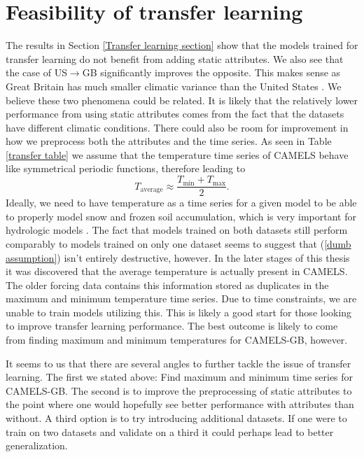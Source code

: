 \section{Feasibility of transfer learning}
The results in Section \ref{Transfer learning section} show that the models trained 
for transfer learning do not benefit from adding static attributes. We also see 
that the case of US$\rightarrow$GB significantly improves the opposite. This makes 
sense as Great Britain has much smaller climatic variance than the United States 
\citationneeded. We believe these two phenomena could be related. It is likely 
that the relatively lower performance from using static attributes comes from the 
fact that the datasets have different climatic conditions. There could also be 
room for improvement in how we preprocess both the attributes and the time series. 
As seen in Table \ref{transfer table} we assume that the temperature time series 
of CAMELS behave like symmetrical periodic functions, therefore leading to 
\begin{equation}
T_\text{average} \approx  \frac{T_\text{min}+T_\text{max}}{2}. \label{dumb assumption}
\end{equation}
Ideally, we need to have temperature as a time series for a given model to be able 
to properly model snow and frozen soil accumulation, which is very important for 
hydrologic models \citationneeded. The fact that models trained on both datasets 
still perform comparably to models trained on only one dataset seems to suggest 
that (\ref{dumb assumption}) isn't entirely destructive, however.
In the later stages of this thesis it was discovered that the average temperature 
is actually present in CAMELS. The older \citationneeded forcing data contains 
this information stored as duplicates in the maximum and minimum temperature time 
series. Due to time constraints, we are unable to train models utilizing this. 
This is likely a good start for those looking to improve transfer learning performance. 
The best outcome is likely to come from finding maximum and minimum temperatures 
for CAMELS-GB, however.

It seems to us that there are several angles to further tackle the issue of transfer 
learning. The first we stated above: Find maximum and minimum time series for 
CAMELS-GB. The second is to improve the preprocessing of static attributes to 
the point where one would hopefully see better performance with attributes than 
without. A third option is to try introducing additional datasets. If one were to 
train on two datasets and validate on a third it could perhaps lead to better 
generalization. 

